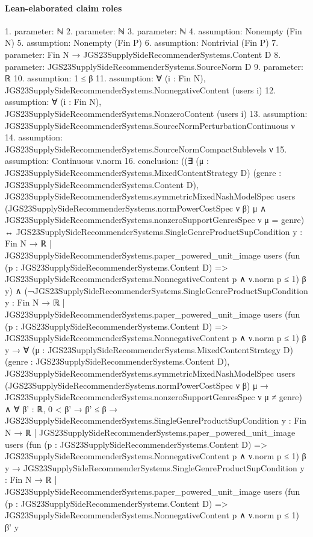 \documentclass[10pt]{article}
\begin{document}
\paragraph{Lean-elaborated claim roles}\begin{ReviewVerbatim}
1. parameter: ℕ
2. parameter: ℕ
3. parameter: ℕ
4. assumption: Nonempty (Fin N)
5. assumption: Nonempty (Fin P)
6. assumption: Nontrivial (Fin P)
7. parameter: Fin N → JGS23SupplySideRecommenderSystems.Content D
8. parameter: JGS23SupplySideRecommenderSystems.SourceNorm D
9. parameter: ℝ
10. assumption: 1 ≤ β
11. assumption: ∀ (i : Fin N), JGS23SupplySideRecommenderSystems.NonnegativeContent (users i)
12. assumption: ∀ (i : Fin N), JGS23SupplySideRecommenderSystems.NonzeroContent (users i)
13. assumption: JGS23SupplySideRecommenderSystems.SourceNormPerturbationContinuous ν
14. assumption: JGS23SupplySideRecommenderSystems.SourceNormCompactSublevels ν
15. assumption: Continuous ν.norm
16. conclusion: ((∃ (μ : JGS23SupplySideRecommenderSystems.MixedContentStrategy D) (genre :
      JGS23SupplySideRecommenderSystems.Content D),
      JGS23SupplySideRecommenderSystems.symmetricMixedNashModelSpec users
          (JGS23SupplySideRecommenderSystems.normPowerCostSpec ν β) μ ∧
        JGS23SupplySideRecommenderSystems.nonzeroSupportGenresSpec ν μ = {genre}) ↔
    JGS23SupplySideRecommenderSystems.SingleGenreProductSupCondition
      {y : Fin N → ℝ |
        JGS23SupplySideRecommenderSystems.paper_powered_unit_image users
          (fun (p : JGS23SupplySideRecommenderSystems.Content D) =>
            JGS23SupplySideRecommenderSystems.NonnegativeContent p ∧ ν.norm p ≤ 1)
          β y}) ∧
  (¬JGS23SupplySideRecommenderSystems.SingleGenreProductSupCondition
          {y : Fin N → ℝ |
            JGS23SupplySideRecommenderSystems.paper_powered_unit_image users
              (fun (p : JGS23SupplySideRecommenderSystems.Content D) =>
                JGS23SupplySideRecommenderSystems.NonnegativeContent p ∧ ν.norm p ≤ 1)
              β y} →
      ∀ (μ : JGS23SupplySideRecommenderSystems.MixedContentStrategy D)
        (genre : JGS23SupplySideRecommenderSystems.Content D),
        JGS23SupplySideRecommenderSystems.symmetricMixedNashModelSpec users
            (JGS23SupplySideRecommenderSystems.normPowerCostSpec ν β) μ →
          JGS23SupplySideRecommenderSystems.nonzeroSupportGenresSpec ν μ ≠ {genre}) ∧
    ∀ {β' : ℝ},
      0 < β' →
        β' ≤ β →
          JGS23SupplySideRecommenderSystems.SingleGenreProductSupCondition
              {y : Fin N → ℝ |
                JGS23SupplySideRecommenderSystems.paper_powered_unit_image users
                  (fun (p : JGS23SupplySideRecommenderSystems.Content D) =>
                    JGS23SupplySideRecommenderSystems.NonnegativeContent p ∧ ν.norm p ≤ 1)
                  β y} →
            JGS23SupplySideRecommenderSystems.SingleGenreProductSupCondition
              {y : Fin N → ℝ |
                JGS23SupplySideRecommenderSystems.paper_powered_unit_image users
                  (fun (p : JGS23SupplySideRecommenderSystems.Content D) =>
                    JGS23SupplySideRecommenderSystems.NonnegativeContent p ∧ ν.norm p ≤ 1)
                  β' y}
\end{ReviewVerbatim}
\end{document}
